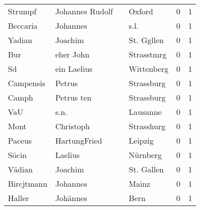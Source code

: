 \begin{tabular}{llllrr}
                  Strumpf &                    Johannes Rudolf &             &                                      Oxford &          0 &         1 \\
                 Beccaria &                           Johannes &             &                                        s.l. &          0 &         1 \\
                   Yadian &                            Joachim &             &                                  St. Ggllen &          0 &         1 \\
                      Bur &                          eher John &             &                                  Strasstmrg &          0 &         1 \\
                       Sd &                        ein Laelius &             &                                  Wittenberg &          0 &         1 \\
                Campensis &                             Petrus &             &                                  Strassburg &          0 &         1 \\
                    Camph &                         Petrus ten &             &                                  Strassburg &          0 &         1 \\
                      VaU &                               s.n. &             &                                    Lausanne &          0 &         1 \\
                     Mont &                          Christoph &             &                                  Strasshurg &          0 &         1 \\
                   Paceus &                       HartungFried &             &                                     Leipzig &          0 &         1 \\
                    Söcin &                            Laelius &             &                                    Nürnberg &          0 &         1 \\
                   Vädian &                            Joachim &             &                                  St. Gallen &          0 &         1 \\
               Bircjtmann &                           Johannes &             &                                       Mainz &          0 &         1 \\
                   Haller &                           Johännes &             &                                        Bern &          0 &         1 \\

\end{tabular}
